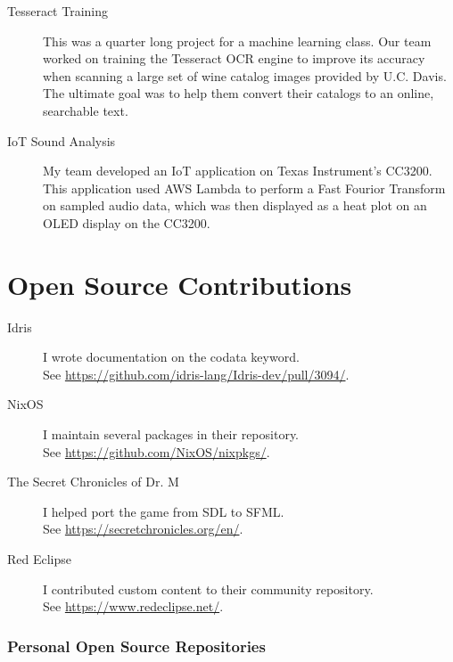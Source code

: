 \documentclass{article}
\newcommand{\osscontrib}[3]{\item[#1] #2\hfill\\See #3.}
\begin{document}
\begin{description}
    \item[Tesseract Training]
        This was a quarter long project for a machine learning class.
        Our team worked on training the Tesseract OCR engine to improve its
        accuracy when scanning a large set of wine catalog images provided by
        U.C.  Davis.
        The ultimate goal was to help them convert their catalogs to an online,
        searchable text.

    \item[IoT Sound Analysis]
        My team developed an IoT application on Texas Instrument's CC3200.
        This application used AWS Lambda to perform a Fast Fourior
        Transform on sampled audio data, which was then displayed as a
        heat plot on an OLED display on the CC3200.
\end{description}


\section*{Open Source Contributions}

\begin{description}
    \osscontrib{Idris}{I wrote documentation on the codata keyword.}{\url{https://github.com/idris-lang/Idris-dev/pull/3094/}}

    \osscontrib{NixOS}{I maintain several packages in their repository.}{\url{https://github.com/NixOS/nixpkgs/}}

    \osscontrib{The Secret Chronicles of Dr. M}{I helped port the game
    from SDL to SFML.}{\url{https://secretchronicles.org/en/}}

    \osscontrib{Red Eclipse}{I contributed custom content to their community
    repository.}{\url{https://www.redeclipse.net/}}
\end{description}

\subsubsection*{Personal Open Source Repositories}
\end{document}
